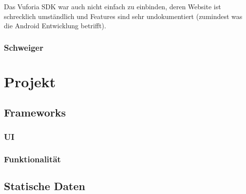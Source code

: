 \documentclass{mrtrash}
\begin{document}
Das Vuforia SDK war auch nicht einfach zu einbinden, deren Website ist schrecklich umständlich und Features sind sehr undokumentiert (zumindest was die Android Entwicklung betrifft).

\subsection{Schweiger}

\lorem \lorem \lorem

\chapter{Projekt}

\section{Frameworks}



\subsection{UI}

\subsection{Funktionalität}

\section{Statische Daten}


%
%
\end{document}
